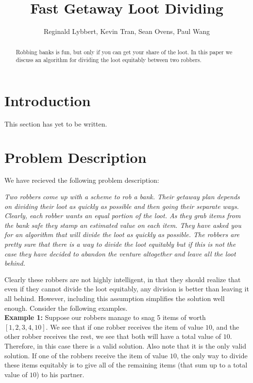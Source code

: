 \documentclass{article}
\title{Fast Getaway Loot Dividing}
\author{Reginald Lybbert, Kevin Tran, Sean Ovens, Paul Wang}
\begin{document}
\maketitle

\begin{abstract}
Robbing banks is fun, but only if you can get your share of the loot.  In this paper we discuss an algorithm for dividing the loot equitably between two robbers.
\end{abstract}
\section{Introduction}

This section has yet to be written.


\section{Problem Description}

We have recieved the following problem description:

\textit{
Two robbers come up with a scheme to rob a bank. Their getaway plan depends on dividing their loot
as quickly as possible and then going their separate ways. Clearly, each robber wants an equal portion of
the loot. As they grab items from the bank safe they stamp an estimated value on each item. They have
asked you for an algorithm that will divide the loot as quickly as possible. The robbers are pretty sure
that there is a way to divide the loot equitably but if this is not the case they have decided to abandon
the venture altogether and leave all the loot behind.
}

Clearly these robbers are not highly intelligent, in that they should realize that even if they cannot divide the loot equitably, any division is better than leaving it all behind.  However, including this assumption simplifies the solution well enough.  Consider the following examples. \\

\textbf{Example 1:}  Suppose our robbers manage to snag 5 items of worth $[1,2,3,4,10]$.  We see that if one robber receives the item of value $10$, and the other robber receives the rest, we see that both will have a total value of $10$.  Therefore, in this case there is a valid solution.  Also note that it is the only valid solution. If one of the robbers receive the item of value $10$, the only way to divide these items equitably is to give all of the remaining items (that sum up to a total value of $10$) to his partner. \\
\end{document}
